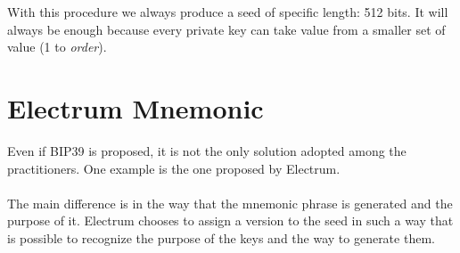 \begin{remark}
	With this procedure we always produce a seed of specific length: 512 bits. It will always be enough because every private key can take value from a smaller set of value (1 to \textit{order}).
\end{remark}

\section{Electrum Mnemonic}
Even if BIP39 is proposed, it is not the only solution adopted among the practitioners. One example is the one proposed by Electrum.
\\ \\
The main difference is in the way that the mnemonic phrase is generated and the purpose of it. Electrum chooses to assign a version to the seed in such a way that is possible to recognize the purpose of the keys and the way to generate them.

